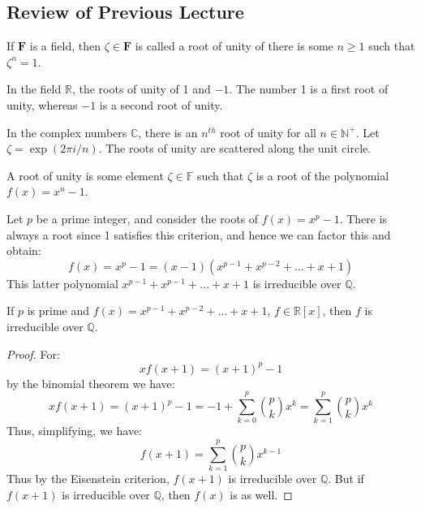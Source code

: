 \documentclass{article}                                                        %
\begin{document}
        \subsection{Review of Previous Lecture}
            If $\mathbf{F}$ is a field, then $\zeta\in\mathbf{F}$ is called a
            root of unity of there is some $n\geq{1}$ such that $\zeta^{n}=1$.
            \begin{example}
                In the field $\mathbb{R}$, the roots of unity of 1 and
                $\minus{1}$. The number 1 is a first root of unity, whereas
                $\minus{1}$ is a second root of unity.
            \end{example}
            \begin{example}
                In the complex numbers $\mathbb{C}$, there is an $n^{th}$ root
                of unity for all $n\in\mathbb{N}^{+}$. Let
                $\zeta=\exp(2\pi{i}/n)$. The roots of unity are scattered along
                the unit circle.
            \end{example}
            A root of unity is some element $\zeta\in\mathbb{F}$ such that
            $\zeta$ is a root of the polynomial $f(x)=x^{n}-1$.
            \begin{example}
                Let $p$ be a prime integer, and consider the roots of
                $f(x)=x^{p}-1$. There is always a root since 1 satisfies this
                criterion, and hence we can factor this and obtain:
                \begin{equation}
                    f(x)=x^{p}-1=(x-1)(x^{p-1}+x^{p-2}+\dots+x+1)
                \end{equation}
                This latter polynomial $x^{p-1}+x^{p-1}+\dots+x+1$ is
                irreducible over $\mathbb{Q}$.
            \end{example}
            \begin{theorem}
                If $p$ is prime and $f(x)=x^{p-1}+x^{p-2}+\dots+x+1$,
                $f\in\mathbb{R}[x]$, then $f$ is irreducible over $\mathbb{Q}$.
            \end{theorem}
            \begin{proof}
                For:
                \begin{equation}
                    xf(x+1)=(x+1)^{p}-1
                \end{equation}
                by the binomial theorem we have:
                \begin{equation}
                    xf(x+1)=(x+1)^{p}-1=
                    \minus{1}+\sum_{k=0}^{p}\binom{p}{k}x^{k}
                    =\sum_{k=1}^{p}\binom{p}{k}x^{k}
                \end{equation}
                Thus, simplifying, we have:
                \begin{equation}
                    f(x+1)=\sum_{k=1}^{p}\binom{p}{k}x^{k-1}
                \end{equation}
                Thus by the Eisenstein criterion, $f(x+1)$ is irreducible over
                $\mathbb{Q}$. But if $f(x+1)$ is irreducible over $\mathbb{Q}$,
                then $f(x)$ is as well.
            \end{proof}
\end{document}
